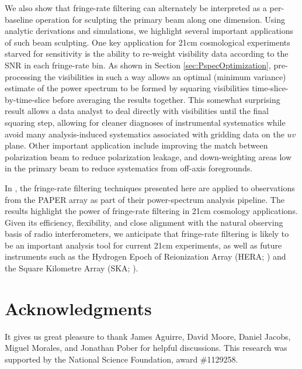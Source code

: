 \documentclass[twocolumn,apj,numberedappendix]{emulateapj}
\begin{document}
We also show that fringe-rate filtering can alternately be interpreted as a per-baseline
operation for sculpting the primary beam along one dimension.
Using analytic
derivations and simulations, we highlight several important applications of such beam
sculpting.  One key application for 21cm cosmological experiments starved for sensitivity
is the ability to re-weight visibility data according to the SNR in each fringe-rate bin.
As shown in Section \ref{sec:PspecOptimization}, pre-processing the visibilities in such a way
allows an optimal (minimum variance) estimate of the power spectrum to be formed by
squaring visibilities time-slice-by-time-slice before averaging the results together. This
somewhat surprising result allows a data analyst to deal directly with visibilities until
the final squaring step, allowing for cleaner diagnoses of instrumental systematics while
avoid many analysis-induced systematics associated with gridding data on the $uv$ plane.
%
Other important application include improving the match between polarization beam to
reduce polarization leakage, and down-weighting areas low in the primary beam
to reduce systematics from off-axis foregrounds.

In \citet{ali_et_al2015}, the fringe-rate filtering techniques presented here are applied to
observations from the PAPER array as part of their power-spectrum analysis pipeline.  The
results highlight the power of fringe-rate filtering in 21cm cosmology applications.
Given its efficiency, flexibility, and close alignment with the natural observing
basis of radio interferometers, we anticipate that fringe-rate filtering is likely to be
an important analysis tool for current 21cm experiments, as well as future instruments
such as the Hydrogen Epoch of Reionization Array (HERA; \citealt{pober_et_al2014}) and
the Square Kilometre Array (SKA; \citealt{carilli2014}).


\section{Acknowledgments}

It gives us great pleasure to thank James Aguirre, David Moore, Daniel Jacobs, 
Miguel Morales, and Jonathan Pober for helpful discussions.  This research
was supported by the National Science Foundation, award \#1129258.




\end{document}
